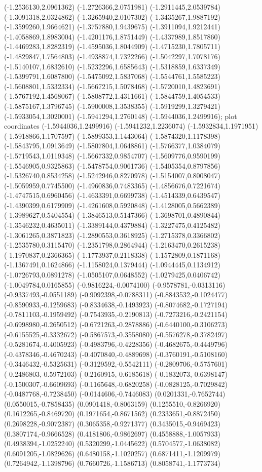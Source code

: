 {{(-1.2536130,2.0961362) (-1.2726366,2.0751981) (-1.2911445,2.0539784) (-1.3091318,2.0324862) (-1.3265940,2.0107302) (-1.3435267,1.9887192) (-1.3599260,1.9664621) (-1.3757880,1.9439675) (-1.3911094,1.9212441) (-1.4058869,1.8983004) (-1.4201176,1.8751449) (-1.4337989,1.8517860) (-1.4469283,1.8282319) (-1.4595036,1.8044909) (-1.4715230,1.7805711) (-1.4829847,1.7564803) (-1.4938874,1.7322266) (-1.5042297,1.7078176) (-1.5140107,1.6832610) (-1.5232296,1.6585643) (-1.5318859,1.6337349) (-1.5399791,1.6087800) (-1.5475092,1.5837068) (-1.5544761,1.5585223) (-1.5608801,1.5332334) (-1.5667215,1.5078468) (-1.5720010,1.4823691) (-1.5767192,1.4568067) (-1.5808772,1.4311661) (-1.5844759,1.4054533) (-1.5875167,1.3796745) (-1.5900008,1.3538355) (-1.5919299,1.3279421) (-1.5933054,1.3020001) (-1.5941294,1.2760148) (-1.5944036,1.2499916)};
 plot coordinates {(-1.5944036,1.2499916) (-1.5941232,1.2236074) (-1.5932834,1.1971951) (-1.5918866,1.1707597) (-1.5899353,1.1443064) (-1.5874320,1.1178398) (-1.5843795,1.0913649) (-1.5807804,1.0648861) (-1.5766377,1.0384079) (-1.5719543,1.0119348) (-1.5667332,0.9854707) (-1.5609776,0.9590199) (-1.5546905,0.9325863) (-1.5478754,0.9061736) (-1.5405354,0.8797856) (-1.5326740,0.8534258) (-1.5242946,0.8270978) (-1.5154007,0.8008047) (-1.5059959,0.7745500) (-1.4960836,0.7483365) (-1.4856676,0.7221674) (-1.4747515,0.6960456) (-1.4633391,0.6699738) (-1.4514339,0.6439547) (-1.4390399,0.6179909) (-1.4261608,0.5920848) (-1.4128005,0.5662389) (-1.3989627,0.5404554) (-1.3846513,0.5147366) (-1.3698701,0.4890844) (-1.3546232,0.4635011) (-1.3389144,0.4379884) (-1.3227475,0.4125482) (-1.3061265,0.3871823) (-1.2890553,0.3618925) (-1.2715378,0.3366802) (-1.2535780,0.3115470) (-1.2351798,0.2864944) (-1.2163470,0.2615238) (-1.1970837,0.2366365) (-1.1773937,0.2118338) (-1.1572809,0.1871168) (-1.1367491,0.1624866) (-1.1158024,0.1379444) (-1.0944445,0.1134912) (-1.0726793,0.0891278) (-1.0505107,0.0648552) (-1.0279425,0.0406742) (-1.0049784,0.0165855) (-0.9816224,-0.0074100) (-0.9578781,-0.0313116) (-0.9337493,-0.0551189) (-0.9092398,-0.0788311) (-0.8843532,-0.1024477) (-0.8590933,-0.1259683) (-0.8334638,-0.1493923) (-0.8074682,-0.1727194) (-0.7811103,-0.1959492) (-0.7543935,-0.2190813) (-0.7273216,-0.2421154) (-0.6998980,-0.2650512) (-0.6721263,-0.2878886) (-0.6440100,-0.3106273) (-0.6155525,-0.3332672) (-0.5867573,-0.3558080) (-0.5576278,-0.3782497) (-0.5281674,-0.4005923) (-0.4983796,-0.4228356) (-0.4682675,-0.4449796) (-0.4378346,-0.4670243) (-0.4070840,-0.4889698) (-0.3760191,-0.5108160) (-0.3446432,-0.5325631) (-0.3129592,-0.5542111) (-0.2809706,-0.5757601) (-0.2486803,-0.5972103) (-0.2160915,-0.6185618) (-0.1832073,-0.6398147) (-0.1500307,-0.6609693) (-0.1165648,-0.6820258) (-0.0828125,-0.7029842) (-0.0487768,-0.7238450) (-0.0144606,-0.7446083) (0.0201331,-0.7652744) (0.0550015,-0.7858435) (0.0901418,-0.8063159) (0.1255510,-0.8266920) (0.1612265,-0.8469720) (0.1971654,-0.8671562) (0.2333651,-0.8872450) (0.2698228,-0.9072387) (0.3065358,-0.9271377) (0.3435015,-0.9469423) (0.3807174,-0.9666528) (0.4181806,-0.9862697) (0.4558888,-1.0057933) (0.4938394,-1.0252240) (0.5320299,-1.0445622) (0.5704577,-1.0638082) (0.6091205,-1.0829626) (0.6480158,-1.1020257) (0.6871411,-1.1209979) (0.7264942,-1.1398796) (0.7660726,-1.1586713) (0.8058741,-1.1773734) }}
